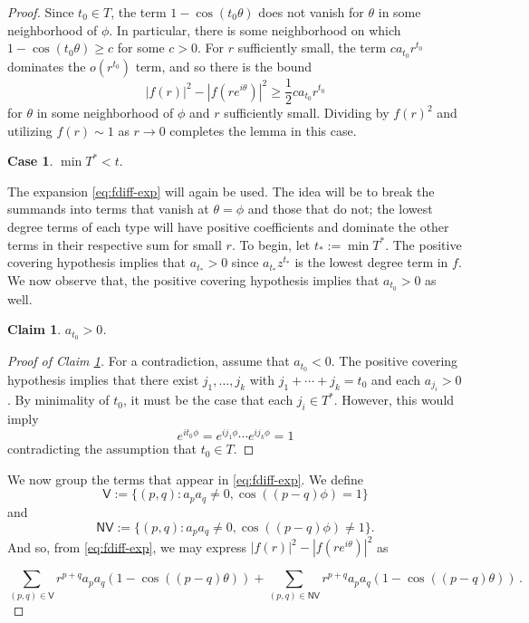 \documentclass{daj}
\def\eit{e^{i\theta}}
\newtheorem{claim}[theorem]{Claim}
\theoremstyle{definition}
\newtheorem{case}{Case}
\theoremstyle{remark}
\begin{document}
\begin{proof}
Since $t_0 \in T$, the term $1 - \cos(t_0\theta)$ does not vanish for $\theta$ in some neighborhood of $\phi$.  In particular, there is some neighborhood on which $1 - \cos(t_0 \theta) \geq c$ for some $c > 0$.  For $r$ sufficiently small, the term $c a_{t_0} r^{t_0}$ dominates the $o(r^{t_0})$ term, and so there is the bound 
%
$$|f(r)|^2 - |f(r \eit)|^2 \geq \frac{1}{2} c a_{t_0} r^{t_0} $$
%
for $\theta$ in some neighborhood of $\phi$ and $r$ sufficiently small. Dividing by $f(r)^2$ and utilizing $f(r) \sim 1$ as $r \to 0$ completes the lemma in this case.
 
\begin{case} $\min T^\ast < t$.
 \end{case}

The expansion \eqref{eq:fdiff-exp} will again be used.  The idea will be to break the summands into terms that vanish at $\theta = \phi$ and those that do not; the lowest degree terms of each type will have positive coefficients and dominate the other terms in their respective sum for small $r$.  To begin, let $t_\ast := \min T^\ast$.  The positive covering hypothesis implies that $a_{t_\ast} > 0$ since $a_{t_\ast} z^{t_\ast}$ is the lowest degree term in $f$.  We now observe that, the positive covering hypothesis implies that $a_{t_0} > 0$ as well.

\begin{claim}\label{claim:t0-positive}
	 $a_{t_0} > 0$.
\end{claim} 
\begin{proof}[{Proof of Claim \ref{claim:t0-positive}}] For a contradiction, assume that $a_{t_0} < 0$.  The positive covering hypothesis implies that there exist $j_1,\ldots,j_k$ with $j_1 + \cdots + j_k = t_0$ and each $a_{j_i} > 0$.  By minimality of $t_0$, it must be the case that each $j_i \in T^\ast$.  However, this would imply $$e^{i t_{0} \phi} = e^{i j_1 \phi} \cdots e^{i j_k \phi} = 1$$ contradicting the assumption that $t_0 \in T$.  \end{proof}

We now group the terms that appear in \eqref{eq:fdiff-exp}. We define
\[ \mathsf{V} := \{(p,q): a_pa_q \neq 0,\cos((p-q)\phi) = 1  \}\] and 
\[ \mathsf{NV}:= \{(p,q) : a_pa_q \neq 0 , \cos((p-q)\phi) \neq 1\}.
\] And so, from \eqref{eq:fdiff-exp}, we may express $|f(r)|^2 - |f(r\eit)|^2$ as 

\begin{equation} \label{eq:fdiff-exp-case2} \sum_{(p,q) \in \mathsf{V}} r^{p+q} a_p a_q(1 - \cos((p-q)\theta) )
+ \sum_{(p,q) \in \mathsf{NV}} r^{p+q} a_p a_q(1 - \cos((p-q)\theta) )\,. 
\end{equation}


\end{proof}
\end{document}
